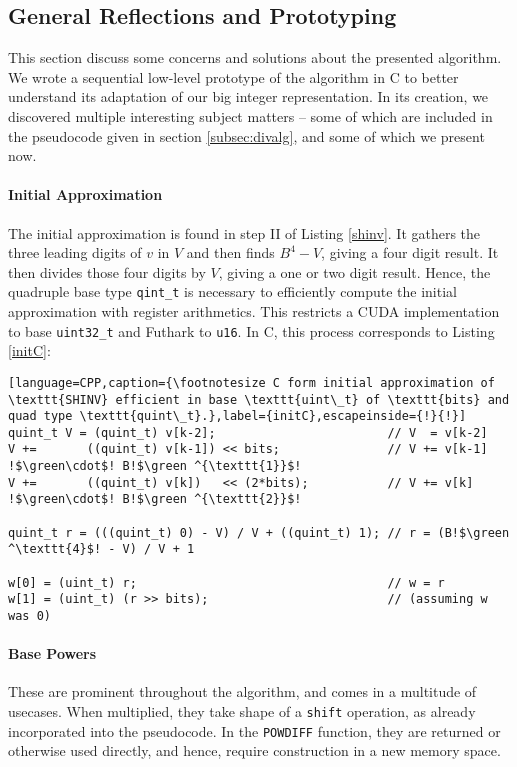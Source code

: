 \subsection{General Reflections and Prototyping}
\label{subsec:divproto}

This section discuss some concerns and solutions about the presented
algorithm. We wrote a sequential low-level prototype of the algorithm in C to
better understand its adaptation of our big integer representation. In its
creation, we discovered multiple interesting subject matters -- some of which
are included in the pseudocode given in section \ref{subsec:divalg}, and some of
which we present now.

\paragraph{Initial Approximation}
The initial approximation is found in step II of Listing \ref{shinv}. It gathers
the three leading digits of $v$ in $V$ and then finds $B^4-V$, giving a four
digit result. It then divides those four digits by $V$, giving a one or two
digit result. Hence, the quadruple base type \texttt{qint\_t} is necessary to
efficiently compute the initial approximation with register arithmetics. This
restricts a CUDA implementation to base \texttt{uint32\_t} and Futhark to
\texttt{u16}. In C, this process corresponds to Listing \ref{initC}:
\begin{lstlisting}[language=CPP,caption={\footnotesize C form initial approximation of \texttt{SHINV} efficient in base \texttt{uint\_t} of \texttt{bits} and quad type \texttt{quint\_t}.},label={initC},escapeinside={!}{!}]
quint_t V = (quint_t) v[k-2];                        // V  = v[k-2]
V +=       ((quint_t) v[k-1]) << bits;               // V += v[k-1] !$\green\cdot$! B!$\green ^{\texttt{1}}$!
V +=       ((quint_t) v[k])   << (2*bits);           // V += v[k]   !$\green\cdot$! B!$\green ^{\texttt{2}}$!

quint_t r = (((quint_t) 0) - V) / V + ((quint_t) 1); // r = (B!$\green ^\texttt{4}$! - V) / V + 1

w[0] = (uint_t) r;                                   // w = r 
w[1] = (uint_t) (r >> bits);                         // (assuming w was 0)
\end{lstlisting}

\paragraph{Base Powers}
These are prominent throughout the algorithm, and comes in a multitude of
usecases. When multiplied, they take shape of a \texttt{shift} operation, as
already incorporated into the pseudocode. In the \texttt{POWDIFF} function,
they are returned or otherwise used directly, and hence, require construction in
a new memory space.

